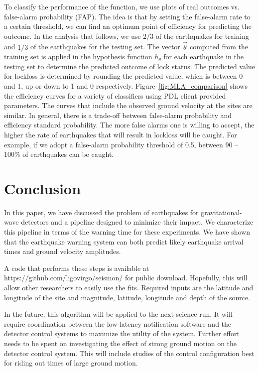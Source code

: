 \documentclass[reprint, prl, aps, showpacs]{revtex4-1}
\begin{document}
To classify the performance of the function, we use plots of real outcomes vs. false-alarm probability (FAP). The idea is that by setting the false-alarm rate to a certain threshold, we can find an optimum point of efficiency for predicting the outcome. In the analysis that follows, we use $2/3$ of the earthquakes for training and  $1/3$ of the earthquakes for the testing set. The vector $\vec\theta$  computed from the training set is applied in the hypothesis function $h_{\theta}$ for each earthquake in the testing set to determine the predicted outcome of lock status. The predicted value for lockloss is determined by rounding the predicted value, which is between 0 and 1, up or down to 1 and 0 respectively.
Figure~\ref{fig:MLA_comparison} shows the efficiency curves for a variety of classifiers using PDL client provided parameters. The curves that include the observed ground velocity at the sites are similar. In general, there is a trade-off between false-alarm probability and efficiency standard probability. The more false alarms one is willing to accept, the higher the rate of earthquakes that will result in lockloss will be caught. For example, if we adopt a false-alarm probability threshold of 0.5, between 90 -- 100\% of earthquakes can be caught.
	
	


\section{Conclusion}
\label{sec:conclusions}

In this paper, we have discussed the problem of earthquakes for gravitational-wave detectors and a pipeline designed to minimize their impact. 
We characterize this pipeline in terms of the warning time for these experiments.
We have shown that the earthquake warning system can both predict likely earthquake arrival times and ground velocity amplitudes. 

A code that performs these steps is available at https://github.com/ligovirgo/seismon/ for public download. Hopefully, this will allow other researchers to easily use the fits. Required inputs are the latitude and longitude of the site and magnitude, latitude, longitude and depth of the source.

In the future, this algorithm will be applied to the next science run. It will require coordination between the low-latency notification software and the detector control systems to maximize the utility of the system. 
Further effort needs to be spent on investigating the effect of strong ground motion on the detector control system.
This will include studies of the control configuration best for riding out times of large ground motion.
\end{document}
